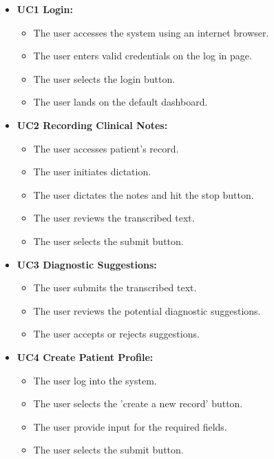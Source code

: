 \documentclass[12pt]{article}
\begin{document}
\begin{itemize}
  \item\textbf{UC1 Login:}
  \begin{itemize}
    \item The user accesses the system using an internet browser.
    \item The user enters valid credentials on the log in page.
    \item The user selects the login button.
    \item The user lands on the default dashboard.
  \end{itemize}
  \item\textbf{UC2 Recording Clinical Notes:}
  \begin{itemize}
    \item The user accesses patient's record.
    \item The user initiates dictation.
    \item The user dictates the notes and hit the stop button.
    \item The user reviews the transcribed text.
    \item The user selects the submit button.
  \end{itemize}
  \item\textbf{UC3 Diagnostic Suggestions:}
  \begin{itemize}
    \item The user submits the transcribed text.
    \item The user reviews the potential diagnostic suggestions.
    \item The user accepts or rejects suggestions.
  \end{itemize}
  \item\textbf{UC4 Create Patient Profile:}
  \begin{itemize}
    \item The user log into the system.
    \item The user selects the 'create a new record' button.
    \item The user provide input for the required fields.    
    \item The user selects the submit button.
  \end{itemize}
\end{itemize}
\end{document}

